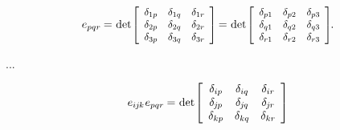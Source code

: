 \nopagebreak\vspace{-0.1em}
\begin{equation}\label{permutationsymbolasdeterminant}
e_{pqr} \hspace{-0.1ex}
= \hspace{.1ex}
\operatorname{det}\hspace{-0.25ex} \scalebox{.92}{$\left[ \begin{array}{ccc}
\delta_{1p} & \delta_{1q} & \delta_{1r} \\
\delta_{2p} & \delta_{2q} & \delta_{2r} \\
\delta_{3p} & \delta_{3q} & \delta_{3r}
\end{array} \hspace{-0.1ex} \right]$} \hspace{-0.2ex}
= \hspace{.1ex}
\operatorname{det}\hspace{-0.25ex} \scalebox{.92}{$\left[ \begin{array}{ccc}
\delta_{p1} & \delta_{p2} & \delta_{p3} \\
\delta_{q1} & \delta_{q2} & \delta_{q3} \\
\delta_{r1} & \delta_{r2} & \delta_{r3}
\end{array} \hspace{-0.1ex} \right]$}
\hspace{-0.2ex} .
\end{equation}

...


\nopagebreak\vspace{-0.1em}
\begin{equation}\label{doublepermutationsymbols}
e_{i\hspace{-0.1ex}j\hspace{-0.1ex}k} \hspace{.1ex} e_{pqr}
\hspace{-0.1ex} = \hspace{.1ex}
\operatorname{det} \hspace{-0.25ex} \left[
\begin{array}{ccc}
\delta_{ip} & \delta_{iq} & \delta_{ir} \\
\delta_{\hspace{-0.1ex}j\hspace{-0.1ex}p} & \delta_{\hspace{-0.1ex}j\hspace{-0.1ex}q} & \delta_{\hspace{-0.1ex}j\hspace{-0.1ex}r} \\
\delta_{kp} & \delta_{kq} & \delta_{kr}
\end{array}\hspace{-0.1ex}
\right]
\end{equation}

